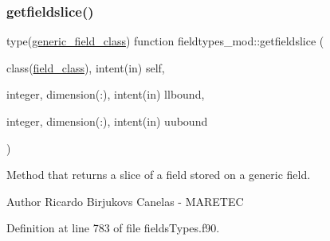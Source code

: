 \subsubsection{\texorpdfstring{getfieldslice()}{getfieldslice()}}
{\footnotesize\ttfamily type(\mbox{\hyperlink{structfieldtypes__mod_1_1generic__field__class}{generic\+\_\+field\+\_\+class}}) function fieldtypes\+\_\+mod\+::getfieldslice (\begin{DoxyParamCaption}\item[{class(\mbox{\hyperlink{structfieldtypes__mod_1_1field__class}{field\+\_\+class}}), intent(in)}]{self,  }\item[{integer, dimension(\+:), intent(in)}]{llbound,  }\item[{integer, dimension(\+:), intent(in)}]{uubound }\end{DoxyParamCaption})\hspace{0.3cm}{\ttfamily [private]}}



Method that returns a slice of a field stored on a generic field. 

\begin{DoxyAuthor}{Author}
Ricardo Birjukovs Canelas -\/ M\+A\+R\+E\+T\+EC 
\end{DoxyAuthor}


Definition at line 783 of file fields\+Types.\+f90.



